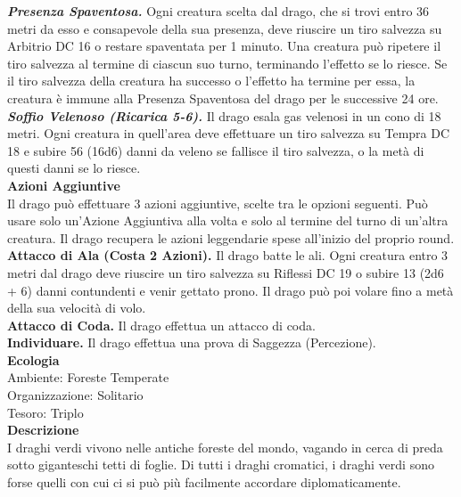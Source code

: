 \begin{multicols}{2}
\emph{\textbf{Presenza Spaventosa.}} Ogni creatura scelta dal drago, che si trovi entro 36 metri da esso e consapevole della sua presenza, deve riuscire un tiro salvezza su Arbitrio DC 16 o restare spaventata per 1 minuto. Una creatura può ripetere il tiro salvezza al termine di ciascun suo turno, terminando l'effetto se lo riesce. Se il tiro salvezza della creatura ha successo o l'effetto ha termine per essa, la creatura è immune alla Presenza Spaventosa del drago per le successive 24 ore.\\
\emph{\textbf{Soffio Velenoso (Ricarica 5-6).}} Il drago esala gas velenosi in un cono di 18 metri. Ogni creatura in quell'area deve effettuare un tiro salvezza su Tempra DC 18 e subire 56 (16d6) danni da veleno se fallisce il tiro salvezza, o la metà di questi danni se lo riesce.\\
\textbf{Azioni Aggiuntive}\\
Il drago può effettuare 3 azioni aggiuntive, scelte tra le opzioni seguenti. Può usare solo un'Azione Aggiuntiva alla volta e solo al termine del turno di un'altra creatura. Il drago recupera le azioni leggendarie spese all'inizio del proprio round.
\textbf{Attacco di Ala (Costa 2 Azioni).} Il drago batte le ali. Ogni creatura entro 3 metri dal drago deve riuscire un tiro salvezza su Riflessi DC 19 o subire 13 (2d6 + 6) danni contundenti e venir gettato prono. Il drago può poi volare fino a metà della sua velocità di volo.\\
\textbf{Attacco di Coda.} Il drago effettua un attacco di coda.\\
\textbf{Individuare.} Il drago effettua una prova di Saggezza (Percezione).\\
\textbf{Ecologia}\\
Ambiente: Foreste Temperate\\
Organizzazione: Solitario\\
Tesoro: Triplo\\
\textbf{Descrizione}\\
I draghi verdi vivono nelle antiche foreste del mondo, vagando in cerca di preda sotto giganteschi tetti di foglie. Di tutti i draghi cromatici, i draghi verdi sono forse quelli con cui ci si può più facilmente accordare diplomaticamente.\\


\end{multicols}
